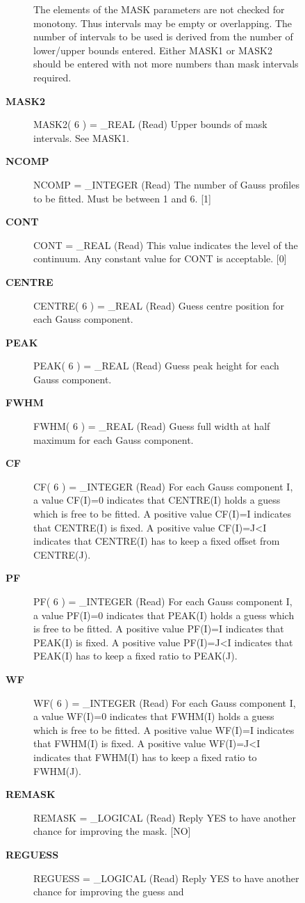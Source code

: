\begin{description}
\begin{description}
\begin{description}
   The elements of the MASK parameters are not checked for
   monotony. Thus intervals may be empty or overlapping. The
   number of intervals to be used is derived from the number of
   lower/upper bounds entered. Either MASK1 or MASK2 should be
   entered with not more numbers than mask intervals required.
\item [\textbf{MASK2}]
MASK2( 6 ) = \_REAL (Read)
   Upper bounds of mask intervals. See MASK1.
\item [\textbf{NCOMP}]
NCOMP = \_INTEGER (Read)
   The number of Gauss profiles to be fitted. Must be between 1
   and 6. [1]
\item [\textbf{CONT}]
CONT = \_REAL (Read)
   This value indicates the level of the continuum. Any constant
   value for CONT is acceptable. [0]
\item [\textbf{CENTRE}]
CENTRE( 6 ) = \_REAL (Read)
   Guess centre position for each Gauss component.
\item [\textbf{PEAK}]
PEAK( 6 ) = \_REAL (Read)
   Guess peak height for each Gauss component.
\item [\textbf{FWHM}]
FWHM( 6 ) = \_REAL (Read)
   Guess full width at half maximum for each Gauss component.
\item [\textbf{CF}]
CF( 6 ) = \_INTEGER (Read)
   For each Gauss component I, a value CF(I)=0 indicates that
   CENTRE(I) holds a guess which is free to be fitted.
   A positive value CF(I)=I indicates that CENTRE(I) is fixed.
   A positive value CF(I)=J<I indicates that CENTRE(I) has to
   keep a fixed offset from CENTRE(J).
\item [\textbf{PF}]
PF( 6 ) = \_INTEGER (Read)
   For each Gauss component I, a value PF(I)=0 indicates that
   PEAK(I) holds a guess which is free to be fitted.
   A positive value PF(I)=I indicates that PEAK(I) is fixed.
   A positive value PF(I)=J<I indicates that PEAK(I) has to
   keep a fixed ratio to PEAK(J).
\item [\textbf{WF}]
WF( 6 ) = \_INTEGER (Read)
   For each Gauss component I, a value WF(I)=0 indicates that
   FWHM(I) holds a guess which is free to be fitted.
   A positive value WF(I)=I indicates that FWHM(I) is fixed.
   A positive value WF(I)=J<I indicates that FWHM(I) has to
   keep a fixed ratio to FWHM(J).
\item [\textbf{REMASK}]
REMASK = \_LOGICAL (Read)
   Reply YES to have another chance for improving the mask.
   [NO]
\item [\textbf{REGUESS}]
REGUESS = \_LOGICAL (Read)
   Reply YES to have another chance for improving the guess and

\end{description}
\end{description}
\end{description}
